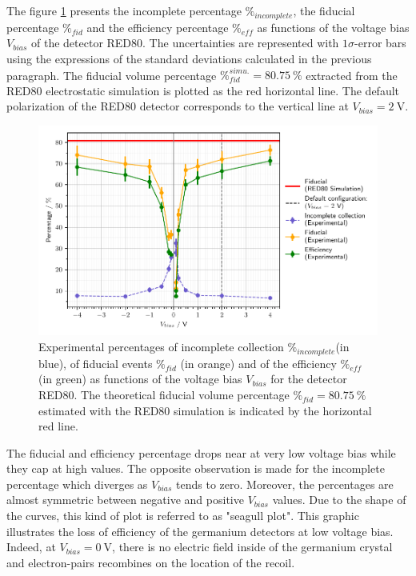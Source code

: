 The figure \ref{fig:red80-experimental-fiducial-volume} presents the incomplete percentage $\%_{incomplete}$, the fiducial percentage $\%_{fid}$ and the efficiency percentage $\%_{eff}$ as functions of the voltage bias $V_{bias}$ of the detector RED80. The uncertainties are represented with $1\sigma$-error bars using the expressions of the standard deviations calculated in the previous paragraph. The fiducial volume percentage $\%_{fid}^{simu.}=\SI{80.75}{\percent}$ extracted from the RED80 electrostatic simulation is plotted as the red horizontal line. The default polarization of the RED80 detector corresponds to the vertical line at $V_{bias}=\SI{2}{\volt}$.

\begin{figure}
\centering
\includegraphics[scale=1]{Figures/ElectrodesExperimental/red80_experimental_fiducial_volume.pdf}
\caption{Experimental percentages of incomplete collection $\%_{incomplete}$(in blue), of fiducial events $\%_{fid}$ (in orange) and of the efficiency $\%_{eff}$ (in green) as functions of the voltage bias $V_{bias}$ for the detector RED80. The theoretical fiducial volume percentage $\%_{fid}=\SI{80.75}{\percent}$ estimated with the RED80 simulation is indicated by the horizontal red line.}
\label{fig:red80-experimental-fiducial-volume}
\end{figure}

The fiducial and efficiency percentage drops near at very low voltage bias while they cap at high values. The opposite observation is made for the incomplete percentage which diverges as $V_{bias}$ tends to zero. Moreover, the percentages are almost symmetric between negative and positive $V_{bias}$ values. Due to the shape of the curves, this kind of plot is referred to as "seagull plot". This graphic illustrates the loss of efficiency of the germanium detectors at low voltage bias. Indeed, at $V_{bias}=\SI{0}{\volt}$, there is no electric field inside of the germanium crystal and electron-pairs recombines on the location of the recoil. 

